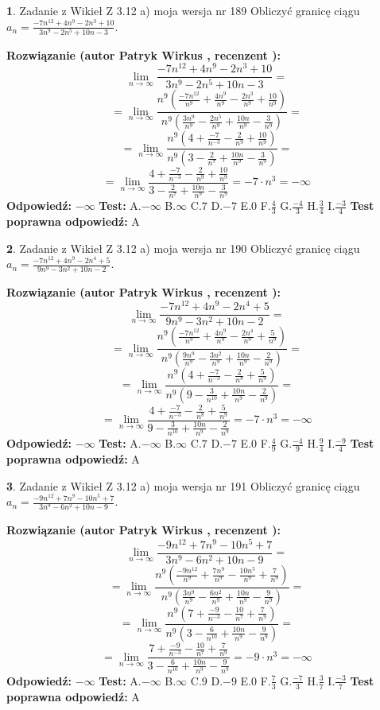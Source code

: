 \documentclass[12pt, a4paper]{article}
\theoremstyle{definition} %
\newtheorem{zad}{}
\newcommand{\zadStart}[1]{\begin{zad}#1\newline}
\newcommand{\zadStop}{\end{zad}}
\newcommand{\rozwStart}[2]{\noindent \textbf{Rozwiązanie (autor #1 , recenzent #2): }\newline}
\newcommand{\rozwStop}{\newline}
\newcommand{\odpStart}{\noindent \textbf{Odpowiedź:}\newline}
\newcommand{\odpStop}{\newline}
\newcommand{\testStart}{\noindent \textbf{Test:}\newline}
\newcommand{\testStop}{\newline}
\newcommand{\kluczStart}{\noindent \textbf{Test poprawna odpowiedź:}\newline}
\newcommand{\kluczStop}{\newline}
\begin{document}
\zadStart{Zadanie z Wikieł Z 3.12 a) moja wersja nr 189}
Obliczyć granicę ciągu $a_{n}=\frac{-7n^{12}+4n^{9}-2n^{3}+10}{3n^{9}-2n^{5}+10n-3}$.
\zadStop
\rozwStart{Patryk Wirkus}{}
$$\lim\limits_{n\to\infty}\frac{-7n^{12}+4n^{9}-2n^{3}+10}{3n^{9}-2n^{5}+10n-3}=$$
$$=\lim\limits_{n\to\infty}\frac{n^{9}\left(\frac{-7n^{12}}{n^{9}}+\frac{4n^{9}}{n^{9}}-\frac{2n^{3}}{n^{9}}+\frac{10}{n^{9}}\right)}{n^{9}\left(\frac{3n^{9}}{n^{9}}-\frac{2n^{5}}{n^{9}}+\frac{10n}{n^{9}}-\frac{3}{n^{9}}\right)}=$$
$$=\lim\limits_{n\to\infty}\frac{n^{9}\left(4+\frac{-7}{n^{-3}}-\frac{2}{n^{9}}+\frac{10}{n^{9}}\right)}
{n^{9}\left(3-\frac{2}{n^{7}}+\frac{10n}{n^{9}}-\frac{3}{n^{9}}\right)}=$$
$$=\lim\limits_{n\to\infty}\frac{4+\frac{-7}{n^{-3}}-\frac{2}{n^{9}}+\frac{10}{n^{9}}}{3-\frac{2}{n^{7}}+\frac{10n}{n^{9}}-\frac{3}{n^{9}}}=-7\cdot n^{3} = -\infty$$
\rozwStop
\odpStart
$-\infty$
\odpStop
\testStart
A.$-\infty$
B.$\infty$
C.$7$
D.$-7$
E.$0$
F.$\frac{4}{3}$
G.$\frac{-4}{3}$
H.$\frac{3}{4}$
I.$\frac{-3}{4}$
\testStop
\kluczStart
A
\kluczStop



\zadStart{Zadanie z Wikieł Z 3.12 a) moja wersja nr 190}
Obliczyć granicę ciągu $a_{n}=\frac{-7n^{12}+4n^{9}-2n^{4}+5}{9n^{9}-3n^{2}+10n-2}$.
\zadStop
\rozwStart{Patryk Wirkus}{}
$$\lim\limits_{n\to\infty}\frac{-7n^{12}+4n^{9}-2n^{4}+5}{9n^{9}-3n^{2}+10n-2}=$$
$$=\lim\limits_{n\to\infty}\frac{n^{9}\left(\frac{-7n^{12}}{n^{9}}+\frac{4n^{9}}{n^{9}}-\frac{2n^{4}}{n^{9}}+\frac{5}{n^{9}}\right)}{n^{9}\left(\frac{9n^{9}}{n^{9}}-\frac{3n^{2}}{n^{9}}+\frac{10n}{n^{9}}-\frac{2}{n^{9}}\right)}=$$
$$=\lim\limits_{n\to\infty}\frac{n^{9}\left(4+\frac{-7}{n^{-3}}-\frac{2}{n^{8}}+\frac{5}{n^{9}}\right)}
{n^{9}\left(9-\frac{3}{n^{10}}+\frac{10n}{n^{9}}-\frac{2}{n^{9}}\right)}=$$
$$=\lim\limits_{n\to\infty}\frac{4+\frac{-7}{n^{-3}}-\frac{2}{n^{8}}+\frac{5}{n^{9}}}{9-\frac{3}{n^{10}}+\frac{10n}{n^{9}}-\frac{2}{n^{9}}}=-7\cdot n^{3} = -\infty$$
\rozwStop
\odpStart
$-\infty$
\odpStop
\testStart
A.$-\infty$
B.$\infty$
C.$7$
D.$-7$
E.$0$
F.$\frac{4}{9}$
G.$\frac{-4}{9}$
H.$\frac{9}{4}$
I.$\frac{-9}{4}$
\testStop
\kluczStart
A
\kluczStop



\zadStart{Zadanie z Wikieł Z 3.12 a) moja wersja nr 191}
Obliczyć granicę ciągu $a_{n}=\frac{-9n^{12}+7n^{9}-10n^{5}+7}{3n^{9}-6n^{2}+10n-9}$.
\zadStop
\rozwStart{Patryk Wirkus}{}
$$\lim\limits_{n\to\infty}\frac{-9n^{12}+7n^{9}-10n^{5}+7}{3n^{9}-6n^{2}+10n-9}=$$
$$=\lim\limits_{n\to\infty}\frac{n^{9}\left(\frac{-9n^{12}}{n^{9}}+\frac{7n^{9}}{n^{9}}-\frac{10n^{5}}{n^{9}}+\frac{7}{n^{9}}\right)}{n^{9}\left(\frac{3n^{9}}{n^{9}}-\frac{6n^{2}}{n^{9}}+\frac{10n}{n^{9}}-\frac{9}{n^{9}}\right)}=$$
$$=\lim\limits_{n\to\infty}\frac{n^{9}\left(7+\frac{-9}{n^{-3}}-\frac{10}{n^{7}}+\frac{7}{n^{9}}\right)}
{n^{9}\left(3-\frac{6}{n^{10}}+\frac{10n}{n^{9}}-\frac{9}{n^{9}}\right)}=$$
$$=\lim\limits_{n\to\infty}\frac{7+\frac{-9}{n^{-3}}-\frac{10}{n^{7}}+\frac{7}{n^{9}}}{3-\frac{6}{n^{10}}+\frac{10n}{n^{9}}-\frac{9}{n^{9}}}=-9\cdot n^{3} = -\infty$$
\rozwStop
\odpStart
$-\infty$
\odpStop
\testStart
A.$-\infty$
B.$\infty$
C.$9$
D.$-9$
E.$0$
F.$\frac{7}{3}$
G.$\frac{-7}{3}$
H.$\frac{3}{7}$
I.$\frac{-3}{7}$
\testStop
\kluczStart
A
\kluczStop
\end{document}
